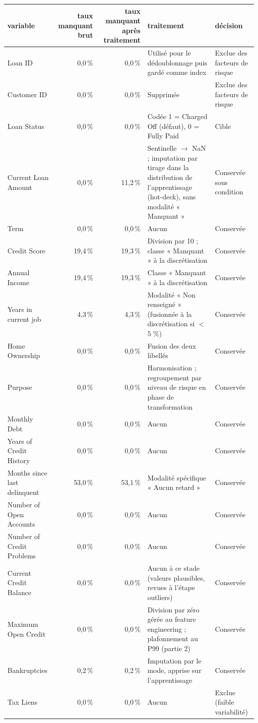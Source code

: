 \begin{tabular}{lrrp{6cm}p{3cm}}
\toprule
\textbf{variable} & \textbf{taux manquant brut} & \textbf{taux manquant après traitement} & \textbf{traitement} & \textbf{décision} \\
\midrule
Loan ID & 0,0\,\% & 0,0\,\% & Utilisé pour le dédoublonnage puis gardé comme index & Exclue des facteurs de risque \\
Customer ID & 0,0\,\% & 0,0\,\% & Supprimée & Exclue des facteurs de risque \\
Loan Status & 0,0\,\% & 0,0\,\% & Codée 1 = Charged Off (défaut), 0 = Fully Paid & Cible \\
Current Loan Amount & 0,0\,\% & 11,2\,\% & Sentinelle $\rightarrow$ NaN ; imputation par tirage dans la distribution de l'apprentissage (hot-deck), sans modalité « Manquant » & Conservée sous condition \\
Term & 0,0\,\% & 0,0\,\% & Aucun & Conservée \\
Credit Score & 19,4\,\% & 19,3\,\% & Division par 10 ; classe « Manquant » à la discrétisation & Conservée \\
Annual Income & 19,4\,\% & 19,3\,\% & Classe « Manquant » à la discrétisation & Conservée \\
Years in current job & 4,3\,\% & 4,3\,\% & Modalité « Non renseigné » (fusionnée à la discrétisation si $<$ 5 \%) & Conservée \\
Home Ownership & 0,0\,\% & 0,0\,\% & Fusion des deux libellés & Conservée \\
Purpose & 0,0\,\% & 0,0\,\% & Harmonisation ; regroupement par niveau de risque en phase de transformation & Conservée \\
Monthly Debt & 0,0\,\% & 0,0\,\% & Aucun & Conservée \\
Years of Credit History & 0,0\,\% & 0,0\,\% & Aucun & Conservée \\
Months since last delinquent & 53,0\,\% & 53,1\,\% & Modalité spécifique « Aucun retard » & Conservée \\
Number of Open Accounts & 0,0\,\% & 0,0\,\% & Aucun & Conservée \\
Number of Credit Problems & 0,0\,\% & 0,0\,\% & Aucun & Conservée \\
Current Credit Balance & 0,0\,\% & 0,0\,\% & Aucun à ce stade (valeurs plausibles, revues à l'étape outliers) & Conservée \\
Maximum Open Credit & 0,0\,\% & 0,0\,\% & Division par zéro gérée au feature engineering ; plafonnement au P99 (partie 2) & Conservée \\
Bankruptcies & 0,2\,\% & 0,2\,\% & Imputation par le mode, apprise sur l'apprentissage & Conservée \\
Tax Liens & 0,0\,\% & 0,0\,\% & Aucun & Exclue (faible variabilité) \\
\bottomrule
\end{tabular}
